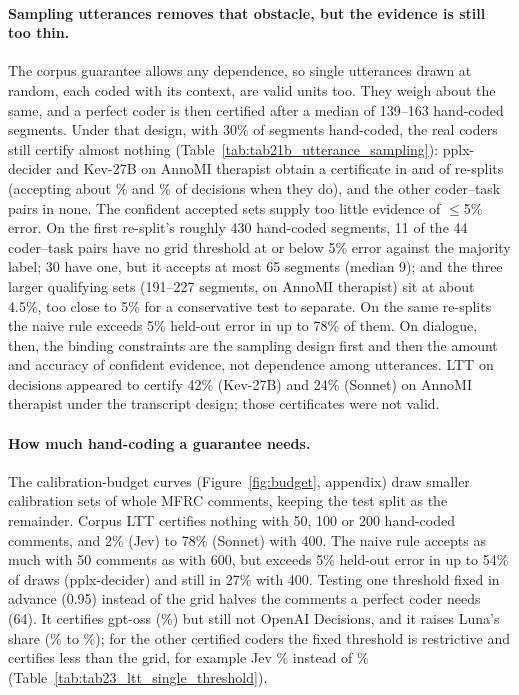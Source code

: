 \paragraph{Sampling utterances removes that obstacle, but the evidence is still too thin.} The corpus guarantee allows any
dependence, so single utterances drawn at random, each coded with its context, are valid units too. They weigh about the
same, and a perfect coder is then certified after a median of 139--163 hand-coded segments. Under that design, with 30\% of
segments hand-coded, the real coders still certify almost nothing (Table~\ref{tab:tab21b_utterance_sampling}): pplx-decider
and Kev-27B on AnnoMI therapist obtain a certificate in  and
 of  re-splits (accepting about \% and
\% of decisions when they do), and the other coder--task pairs in none. The confident
accepted sets supply too little evidence of $\le$5\% error. On the first re-split's roughly 430 hand-coded segments, 11 of the
44 coder--task pairs have no grid threshold at or below 5\% error against the majority label; 30 have one, but it accepts at
most 65 segments (median 9); and the three larger qualifying sets (191--227 segments, on AnnoMI therapist) sit at about 4.5\%,
too close to 5\% for a conservative test to separate. On the same re-splits the naive rule exceeds 5\% held-out error in up to
78\% of them. On dialogue, then, the binding constraints are the sampling design first and then the amount and accuracy of
confident evidence, not dependence among utterances. LTT on decisions appeared to certify 42\% (Kev-27B) and 24\% (Sonnet) on
AnnoMI therapist under the transcript design; those certificates were not valid.

\paragraph{How much hand-coding a guarantee needs.} The calibration-budget curves (Figure~\ref{fig:budget}, appendix) draw
smaller calibration sets of whole MFRC comments, keeping the test split as the remainder. Corpus LTT certifies nothing with
50, 100 or 200 hand-coded comments, and 2\% (Jev) to 78\% (Sonnet) with 400. The naive rule accepts as much with 50 comments
as with 600, but exceeds 5\% held-out error in up to 54\% of draws (pplx-decider) and still in 27\% with 400. Testing one
threshold fixed in advance (0.95) instead of the grid halves the comments a perfect coder needs (64). It certifies gpt-oss
(\%) but still not OpenAI Decisions, and it raises Luna's share (\% to
\%); for the other certified coders the fixed threshold is restrictive and certifies less than the
grid, for example Jev \% instead of \% (Table~\ref{tab:tab23_ltt_single_threshold}).

